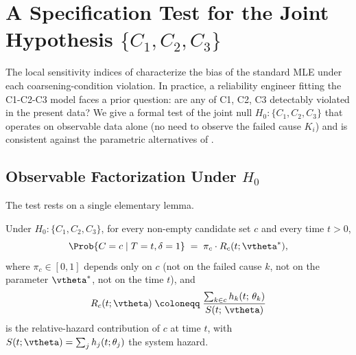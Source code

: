 
\section{A Specification Test for the Joint Hypothesis $\{C_1, C_2, C_3\}$}
\label{sec:spec-test}

The local sensitivity indices of 
characterize the bias of the standard MLE under each coarsening-condition
violation. In practice, a reliability engineer fitting the C1-C2-C3 model
faces a prior question: are any of C1, C2, C3 detectably violated in the
present data? We give a formal test of the joint null
$H_0 \colon \{C_1, C_2, C_3\}$ that operates on observable data alone (no
need to observe the failed cause $K_i$) and is consistent against the
parametric alternatives of .

\subsection{Observable Factorization Under $H_0$}
\label{sec:spec-test-lemma}

The test rests on a single elementary lemma.

\begin{lemma}
\label{lem:factorization}
Under $H_0 \colon \{C_1, C_2, C_3\}$, for every non-empty candidate set
$c$ and every time $t > 0$,
\begin{equation}
\label{eq:factorization}
    \Prob\{C = c \mid T = t, \delta = 1\}
    \;=\; \pi_c \cdot R_c(t; \vtheta^*),
\end{equation}
where $\pi_c \in [0, 1]$ depends only on $c$ (not on the failed cause $k$,
not on the parameter $\vtheta^*$, not on the time $t$), and
\begin{equation}
\label{eq:Rc}
    R_c(t; \vtheta) \;\coloneqq\;
    \frac{\sum_{k \in c} h_k(t;\, \theta_k)}{S(t;\, \vtheta)}
\end{equation}
is the relative-hazard contribution of $c$ at time $t$, with
$S(t; \vtheta) = \sum_j h_j(t; \theta_j)$ the system hazard.
\end{lemma}

